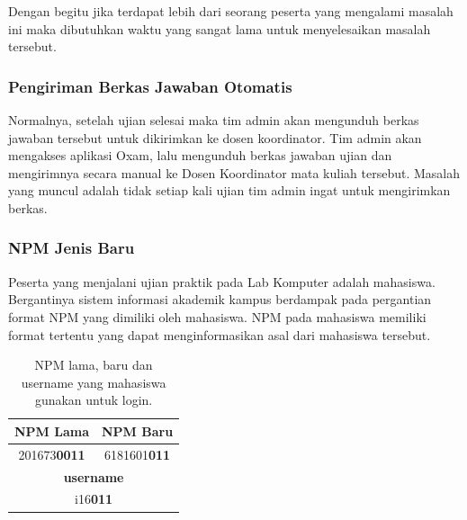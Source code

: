     Dengan begitu jika terdapat lebih dari seorang peserta yang mengalami
    masalah ini maka dibutuhkan waktu yang sangat lama untuk menyelesaikan
    masalah tersebut.

    \subsubsection{Pengiriman Berkas Jawaban
    Otomatis}\label{ref-prob-admin-pengiriman-berkas} 
    Normalnya, setelah ujian
    selesai maka tim admin akan mengunduh berkas jawaban tersebut untuk
    dikirimkan ke dosen koordinator. Tim admin akan mengakses aplikasi Oxam,
    lalu mengunduh berkas jawaban ujian dan mengirimnya secara manual ke Dosen
    Koordinator mata kuliah tersebut. Masalah yang muncul adalah tidak setiap
    kali ujian tim admin ingat untuk mengirimkan berkas.
    
    \subsubsection{NPM Jenis Baru}\label{ref-prob-admin-npm-baru} 
    Peserta yang
    menjalani ujian praktik pada Lab Komputer adalah mahasiswa. Bergantinya
    sistem informasi akademik kampus berdampak pada pergantian format NPM yang
    dimiliki oleh mahasiswa. NPM pada mahasiswa memiliki format tertentu yang
    dapat menginformasikan asal dari mahasiswa tersebut.

    \begin{table}[H]
        \centering
        \caption{NPM lama, baru dan username yang mahasiswa gunakan untuk login.}
        \label{tab:table-npm-detail}
        \def\arraystretch{2}
        \begin{tabular}{|c|c|}
            \hline
            \textbf{NPM Lama} & \textbf{NPM Baru} \\
            \hline
            201673\textbf{0011} & 6181601\textbf{011} \\
            \hline
            \multicolumn{2}{|c|}{\textbf{username}} \\
            \hline
            \multicolumn{2}{|c|}{i16\textbf{011}} \\
            \hline
        \end{tabular}
    \end{table}
    
